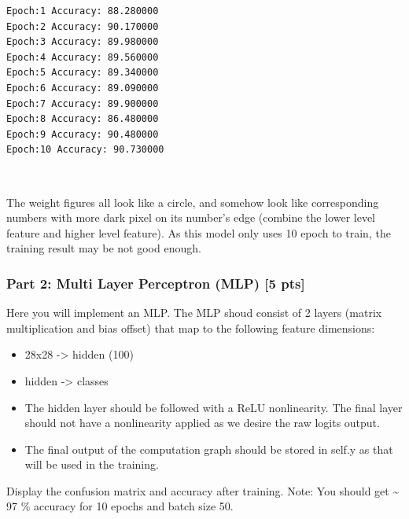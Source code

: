\documentclass[11pt]{article}
\begin{document}
    \begin{Verbatim}[commandchars=\\\{\}]
Epoch:1 Accuracy: 88.280000
Epoch:2 Accuracy: 90.170000
Epoch:3 Accuracy: 89.980000
Epoch:4 Accuracy: 89.560000
Epoch:5 Accuracy: 89.340000
Epoch:6 Accuracy: 89.090000
Epoch:7 Accuracy: 89.900000
Epoch:8 Accuracy: 86.480000
Epoch:9 Accuracy: 90.480000
Epoch:10 Accuracy: 90.730000

    \end{Verbatim}

    \begin{center}
    \end{center}
    { \hspace*{\fill} \\}
    
    The weight figures all look like a circle, and somehow look like
corresponding numbers with more dark pixel on its number's edge (combine
the lower level feature and higher level feature). As this model only
uses 10 epoch to train, the training result may be not good enough.

    \hypertarget{part-2-multi-layer-perceptron-mlp-5-pts}{%
\subsubsection{Part 2: Multi Layer Perceptron (MLP) {[}5
pts{]}}\label{part-2-multi-layer-perceptron-mlp-5-pts}}

Here you will implement an MLP. The MLP shoud consist of 2 layers
(matrix multiplication and bias offset) that map to the following
feature dimensions:

\begin{itemize}
\item
  28x28 -\textgreater{} hidden (100)
\item
  hidden -\textgreater{} classes
\item
  The hidden layer should be followed with a ReLU nonlinearity. The
  final layer should not have a nonlinearity applied as we desire the
  raw logits output.
\item
  The final output of the computation graph should be stored in self.y
  as that will be used in the training.
\end{itemize}

Display the confusion matrix and accuracy after training. Note: You
should get \textasciitilde{} 97 \% accuracy for 10 epochs and batch size
50.
\end{document}
